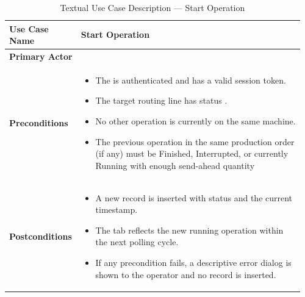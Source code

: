 \begin{longtable}{@{} P{0.21\linewidth} P{0.75\linewidth} @{}}
  
  \caption{Textual Use Case Description --- Start Operation}
  \label{tab:s2-use-case-start-operation}\\
  \toprule
  \endfirsthead
  
  \midrule
  \endhead
  
 
  
  \bottomrule
  \endlastfoot
  
  \textbf{Use Case Name}  & Start Operation     \\
  \midrule
  \textbf{Primary Actor}  &  \\
  \midrule
  \textbf{Preconditions}  &                     
  \begin{itemize}[nosep, leftmargin=*]
  \item The  is authenticated and has a valid session token.
  \item The target routing line has status .
  \item No other operation is currently  on the same machine.
  \item The previous operation in the same production order (if any) must be Finished, Interrupted, or currently
    Running with enough send-ahead quantity
  \end{itemize} \\
  \midrule
  
  \textbf{Postconditions} &                     
  \begin{itemize}[nosep, leftmargin=*]
  \item A new  record is inserted with status
   and the current  timestamp.
  \item The  tab reflects the new running operation
  within the next polling cycle.
  \item If any precondition fails, a descriptive error dialog is shown to the
  operator and no record is inserted.
  \end{itemize} \\
  \midrule
  

\end{longtable}
